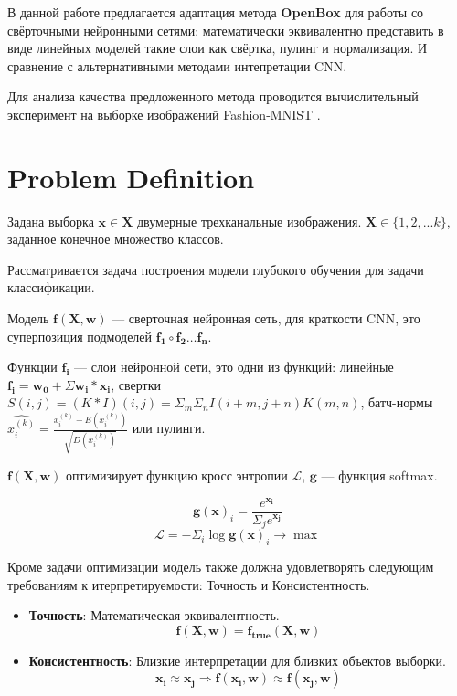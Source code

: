 \documentclass[12pt]{article}
\begin{document}
В данной работе предлагается адаптация метода \textbf{OpenBox} для работы со свёрточными нейронными сетями: математически эквивалентно представить в виде линейных моделей такие слои как свёртка, пулинг и нормализация. И сравнение с альтернативными методами интепретации CNN.

Для анализа качества предложенного метода проводится вычислительный эксперимент на выборке изображений Fashion-MNIST \citep{fashionmnist}.



\section{Problem Definition}
\label{sec:headings}

Задана выборка $\mathbf{x} \in \mathbf{X}$ двумерные трехканальные изображения. $\mathbf{X} \in \{1, 2, ... k\}$, заданное конечное множество классов.

Рассматривается задача построения модели глубокого обучения для задачи классификации.

Модель $\mathbf{f}(\mathbf{X}, \mathbf{w})$ --- сверточная нейронная сеть, для краткости CNN, это суперпозиция подмоделей $\mathbf{f_1} \circ \mathbf{f_2} \dots \mathbf{f_n}$.

Функции $\mathbf{f_i}$ --- слои нейронной сети, это одни из функций: линейные $\mathbf{f_i} = \mathbf{w_0} + \Sigma \mathbf{w_i} * \mathbf{x_i}$, свертки $S(i,j) = (K * I)(i,j) = \Sigma_m \Sigma_n I(i + m, j + n)K(m, n)$, батч-нормы $\hat{x_i^{(k)}} = \frac{x_i^{(k)} - E(x_i^{(k)})}{\sqrt{D(x_i^{(k)})}}$ или пулинги.

$\mathbf{f}(\mathbf{X}, \mathbf{w})$ оптимизирует функцию кросс энтропии $\mathcal{L}$, $\mathbf{g}$ --- функция softmax.

$$\mathbf{g}(\mathbf{x})_i = \frac{e^{\mathbf{x_i}}}{\Sigma_j e^{\mathbf{x_j}}}$$
$$\mathcal{L} = -\Sigma_i \log \mathbf{g}(\mathbf{x})_i \to \max$$

Кроме задачи оптимизации модель также должна удовлетворять следующим требованиям к итерпретируемости: $\textbf{Точность}$ и $\textbf{Консистентность}$.
\begin{itemize}
    \item \textbf{Точность}:
    Математическая эквивалентность.
    $$\mathbf{f}(\mathbf{X}, \mathbf{w}) = \mathbf{f_{true}}(\mathbf{X}, \mathbf{w})$$
    \item \textbf{Консистентность}:
    Близкие интерпретации для близких объектов выборки. $$\mathbf{x_i} \approx \mathbf{x_j} \Longrightarrow \mathbf{f}(\mathbf{x_i}, \mathbf{w}) \approx \mathbf{f}(\mathbf{x_j}, \mathbf{w})$$
\end{itemize}
\end{document}
